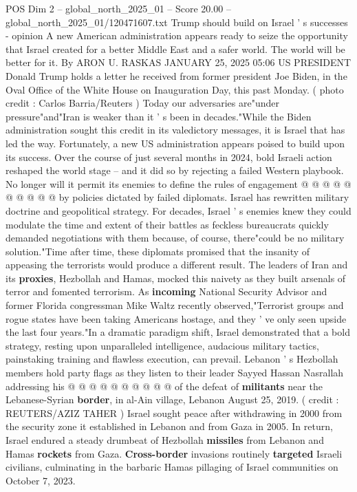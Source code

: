 \begin{textsample}{POS Dim 2 – global\_north\_2025\_01 – Score 20.00 – global\_north\_2025\_01/120471607.txt}  \label{ex:f2_pos_395}
Trump should build on Israel ' s successes - opinion A new American administration appears ready to seize the opportunity that Israel created for a better Middle East and a safer world.
The world will be better for it.
By ARON U.
RASKAS JANUARY 25, 2025 05:06 US PRESIDENT Donald Trump holds a letter he received from former president Joe Biden, in the Oval Office of the White House on Inauguration Day, this past Monday. ( photo credit : Carlos Barria/Reuters ) Today our adversaries are"under pressure"and"Iran is weaker than it ' s been in decades."While the Biden administration sought this credit in its valedictory messages, it is Israel that has led the way.
Fortunately, a new US administration appears poised to build upon its success.
Over the course of just several months in 2024, bold Israeli action reshaped the world stage -- and it did so by rejecting a failed Western playbook.
No longer will it permit its enemies to define the rules of engagement @ @ @ @ @ @ @ @ @ @ by policies dictated by failed diplomats.
Israel has rewritten military doctrine and geopolitical strategy.
For decades, Israel ' s enemies knew they could modulate the time and extent of their battles as feckless bureaucrats quickly demanded negotiations with them because, of course, there"could be no military solution."Time after time, these diplomats promised that the insanity of appeasing the terrorists would produce a different result.
The leaders of Iran and its \textbf{proxies}, Hezbollah and Hamas, mocked this naivety as they built arsenals of terror and fomented terrorism.
As \textbf{incoming} National Security Advisor and former Florida congressman Mike Waltz recently observed,"Terrorist groups and rogue states have been taking Americans hostage, and they ' ve only seen upside the last four years."In a dramatic paradigm shift, Israel demonstrated that a bold strategy, resting upon unparalleled intelligence, audacious military tactics, painstaking training and flawless execution, can prevail.
Lebanon ' s Hezbollah members hold party flags as they listen to their leader Sayyed Hassan Nasrallah addressing his @ @ @ @ @ @ @ @ @ @ of the defeat of \textbf{militants} near the Lebanese-Syrian \textbf{border}, in al-Ain village, Lebanon August 25, 2019. ( credit : REUTERS/AZIZ TAHER ) Israel sought peace after withdrawing in 2000 from the security zone it established in Lebanon and from Gaza in 2005.
In return, Israel endured a steady drumbeat of Hezbollah \textbf{missiles} from Lebanon and Hamas \textbf{rockets} from Gaza. \textbf{Cross-border} invasions routinely \textbf{targeted} Israeli civilians, culminating in the barbaric Hamas pillaging of Israel communities on October 7, 2023.

\end{textsample}
